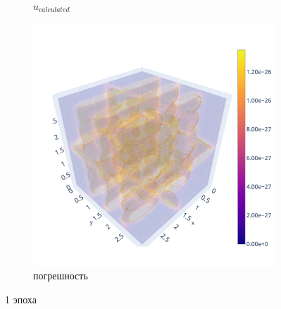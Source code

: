\documentclass[a4paper,hidelinks,12pt]{article}
\begin{document}
\begin{figure}[H]
\begin{subfigure}{.33\textwidth}
  \caption{$u_{calculated}$}
\end{subfigure}%
\begin{subfigure}{.33\textwidth}
  \centering
  \includegraphics[width=\linewidth]{pictures/1_Lpi_128_diff.png}
  \caption{погрешность}
\end{subfigure}%
\caption{1 эпоха}
\label{fig:fig}
\end{figure}
\end{document}
